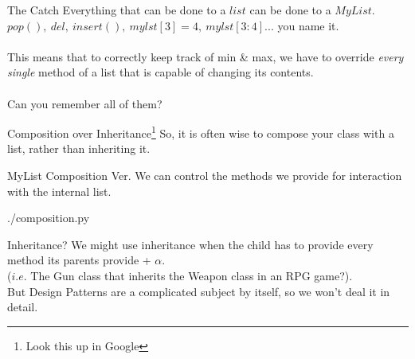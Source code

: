 \documentclass{beamer}
\begin{document}
\begin{frame}{The Catch}
  Everything that can be done to a $list$ can be done to a $MyList$.\\
  $pop(),\ del,\ insert(),\ mylst[3]=4,\ mylst[3:4]$... you name it.\\
  \mbox{}\\
  This means that to correctly keep track of min \& max, we have to override
  \textit{every single} method of a list that is capable of changing its
  contents.\\
  \mbox{}\\
  Can you remember all of them?
\end{frame}

\begin{frame}{Composition over Inheritance\footnote{Look this up in Google}}
    So, it is often wise to compose your class with a list, rather than inheriting
    it.
\end{frame}

\begin{frame}{MyList Composition Ver.}
  We can control the methods we provide for interaction with the internal list.
  \begin{lstinputlisting}[firstline=1, lastline=23]
    {./composition.py}
  \end{lstinputlisting}
\end{frame}

\begin{frame}{Inheritance?}
  We might use inheritance when the child has to provide every method its parents
  provide + $\alpha$. \\($i.e.$ The Gun class that inherits the Weapon class in an RPG
  game?). \\But Design Patterns are a complicated subject by itself, so we won't
  deal it in detail.
\end{frame}
\end{document}
